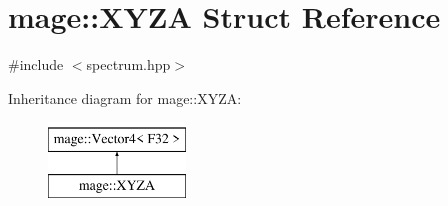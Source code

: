 \hypertarget{structmage_1_1_x_y_z_a}{}\section{mage\+:\+:X\+Y\+ZA Struct Reference}
\label{structmage_1_1_x_y_z_a}


{\ttfamily \#include $<$spectrum.\+hpp$>$}

Inheritance diagram for mage\+:\+:X\+Y\+ZA\+:\begin{figure}[H]
\begin{center}
\leavevmode
\includegraphics[height=2.000000cm]{structmage_1_1_x_y_z_a}
\end{center}
\end{figure}

